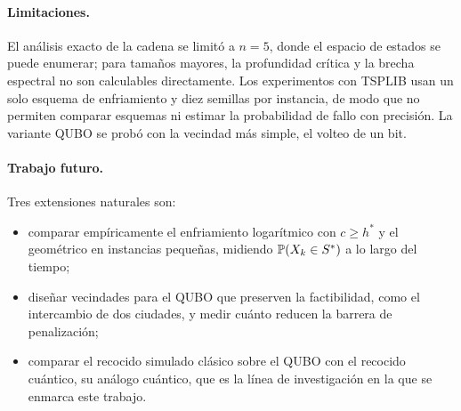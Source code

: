 \paragraph{Limitaciones.} El análisis exacto de la cadena se limitó a
\(n=5\), donde el espacio de estados se puede enumerar; para tamaños
mayores, la profundidad crítica y la brecha espectral no son
calculables directamente. Los experimentos con TSPLIB usan un solo
esquema de enfriamiento y diez semillas por instancia, de modo que no
permiten comparar esquemas ni estimar la probabilidad de fallo con
precisión. La variante QUBO se probó con la vecindad más simple, el
volteo de un bit.

\paragraph{Trabajo futuro.} Tres extensiones naturales son:
\begin{itemize}
    \item comparar empíricamente el enfriamiento logarítmico con
    \(c\ge h^\ast\) y el geométrico en instancias pequeñas, midiendo
    \(\mathbb{P}(X_k\in S^{\ast})\) a lo largo del tiempo;
    \item diseñar vecindades para el QUBO que preserven la factibilidad,
    como el intercambio de dos ciudades, y medir cuánto reducen la
    barrera de penalización;
    \item comparar el recocido simulado clásico sobre el QUBO con el
    recocido cuántico, su análogo cuántico, que es la línea de
    investigación en la que se enmarca este trabajo.
\end{itemize}

